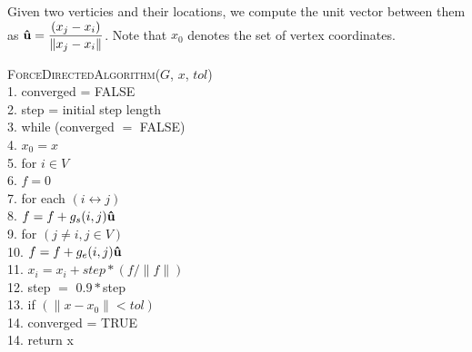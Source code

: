 Given two verticies and their locations, we compute the unit vector between them as $\boldsymbol{\hat{\textbf{u}}} = \dfrac{(x_j-x_i)}{\|x_j-x_i\|}$.
Note that $x_0$ denotes the set of vertex coordinates.
\begin{algorithm}
	\textsc{ForceDirectedAlgorithm}($G$, $x$, $tol$)\\
	1.\hspace{1em} converged = FALSE\\
	2.\hspace{1em} step = initial step length\\
	3.\hspace{1em} while (converged $=$ FALSE) \\
	4.\hspace{2em} $x_0 = x$\\
	5.\hspace{2em} for $i \in V$\\
	6.\hspace{3em} $f = 0$\\
	7.\hspace{3em} for each $(i \leftrightarrow j)$ \\
	8.\hspace{4em} $f = f + g_s(i, j)\boldsymbol{\hat{\textbf{u}}}$\\
	9.\hspace{3em} for $(j \neq i, j \in V)$\\
	10.\hspace{3.5em} $f = f + g_e(i, j)\boldsymbol{\hat{\textbf{u}}}$\\
	11.\hspace{2.5em} $x_i = x_i + step * (f / \| f \|)$\\
	12.\hspace{2.5em} step $=$ $0.9*$step\\
	13.\hspace{2.5em} if $(\|x - x_0\| < tol)$ \\
	14.\hspace{3.5em} converged = TRUE\\
	14.\hspace{1.5em} return x
\end{algorithm}